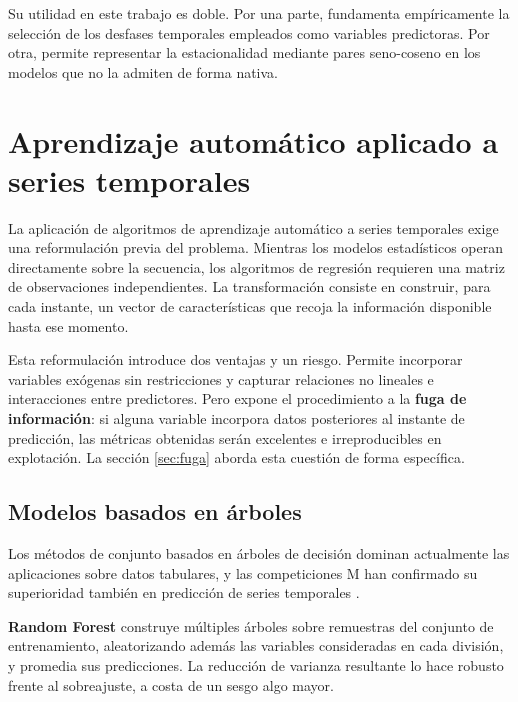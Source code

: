 Su utilidad en este trabajo es doble. Por una parte, fundamenta empíricamente la
selección de los desfases temporales empleados como variables predictoras. Por
otra, permite representar la estacionalidad mediante pares seno-coseno en los
modelos que no la admiten de forma nativa.



\section{Aprendizaje automático aplicado a series temporales}

La aplicación de algoritmos de aprendizaje automático a series temporales exige
una reformulación previa del problema. Mientras los modelos estadísticos operan
directamente sobre la secuencia, los algoritmos de regresión requieren una matriz
de observaciones independientes. La transformación consiste en construir, para
cada instante, un vector de características que recoja la información disponible
hasta ese momento.

Esta reformulación introduce dos ventajas y un riesgo. Permite incorporar
variables exógenas sin restricciones y capturar relaciones no lineales e
interacciones entre predictores. Pero expone el procedimiento a la
\textbf{fuga de información}: si alguna variable incorpora datos posteriores al
instante de predicción, las métricas obtenidas serán excelentes e irreproducibles
en explotación. La sección \ref{sec:fuga} aborda esta cuestión de forma específica.

\subsection{Modelos basados en árboles}

Los métodos de conjunto basados en árboles de decisión dominan actualmente las
aplicaciones sobre datos tabulares, y las competiciones M han confirmado su
superioridad también en predicción de series temporales
\parencite{makridakis2022m5}.

\textbf{Random Forest} \parencite{breiman2001rf} construye múltiples árboles sobre
remuestras del conjunto de entrenamiento, aleatorizando además las variables
consideradas en cada división, y promedia sus predicciones. La reducción de
varianza resultante lo hace robusto frente al sobreajuste, a costa de un sesgo
algo mayor.

